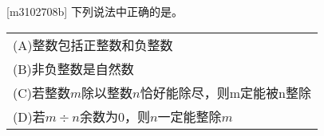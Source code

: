 [m3102708b]\quad
下列说法中正确的是。 \par
\hspace{7em}
\begin{tabular}{l}
    (A)\quad 整数包括正整数和负整数 \\
    (B)\quad 非负整数是自然数 \\
    (C)\quad 若整数$m$除以整数$n$恰好能除尽，则m定能被n整除 \\
    (D)\quad 若$m\div n$余数为0，则$n$一定能整除$m$
\end{tabular}
\par